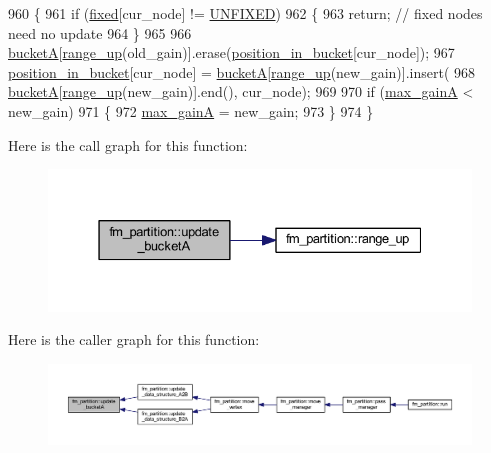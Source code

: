 \begin{DoxyCode}
960 \{
961     \textcolor{keywordflow}{if} (\mbox{\hyperlink{classfm__partition_a3b04658dbb5b27ddd20194ff74a71082}{fixed}}[cur\_node] != \mbox{\hyperlink{classfm__partition_a24447561db0ea633212c597c5e1fca56}{UNFIXED}})
962     \{
963     \textcolor{keywordflow}{return}; \textcolor{comment}{// fixed nodes need no update}
964     \}
965 
966     \mbox{\hyperlink{classfm__partition_a399955e0c84bad93cb82b5ffe8cf4a04}{bucketA}}[\mbox{\hyperlink{classfm__partition_ac49d477ecbf512fa375b76a472ec54f8}{range\_up}}(old\_gain)].erase(\mbox{\hyperlink{classfm__partition_ad17406d94b53c327e31b28e462de010f}{position\_in\_bucket}}[cur\_node]);
967     \mbox{\hyperlink{classfm__partition_ad17406d94b53c327e31b28e462de010f}{position\_in\_bucket}}[cur\_node] = \mbox{\hyperlink{classfm__partition_a399955e0c84bad93cb82b5ffe8cf4a04}{bucketA}}[\mbox{\hyperlink{classfm__partition_ac49d477ecbf512fa375b76a472ec54f8}{range\_up}}(new\_gain)].insert(
968     \mbox{\hyperlink{classfm__partition_a399955e0c84bad93cb82b5ffe8cf4a04}{bucketA}}[\mbox{\hyperlink{classfm__partition_ac49d477ecbf512fa375b76a472ec54f8}{range\_up}}(new\_gain)].end(), cur\_node);
969 
970     \textcolor{keywordflow}{if} (\mbox{\hyperlink{classfm__partition_a6c6a7a05bebe943e681329d30bb13339}{max\_gainA}} < new\_gain)
971     \{
972     \mbox{\hyperlink{classfm__partition_a6c6a7a05bebe943e681329d30bb13339}{max\_gainA}} = new\_gain;
973     \}
974 \}
\end{DoxyCode}
Here is the call graph for this function\+:\nopagebreak
\begin{figure}[H]
\begin{center}
\leavevmode
\includegraphics[width=331pt]{classfm__partition_aa4ec83c52916cc6cac23e7a9987427cd_cgraph}
\end{center}
\end{figure}
Here is the caller graph for this function\+:\nopagebreak
\begin{figure}[H]
\begin{center}
\leavevmode
\includegraphics[width=350pt]{classfm__partition_aa4ec83c52916cc6cac23e7a9987427cd_icgraph}
\end{center}
\end{figure}
\mbox{\label{classfm__partition_a270d469ca584ed9adff9fced67743679}} 
